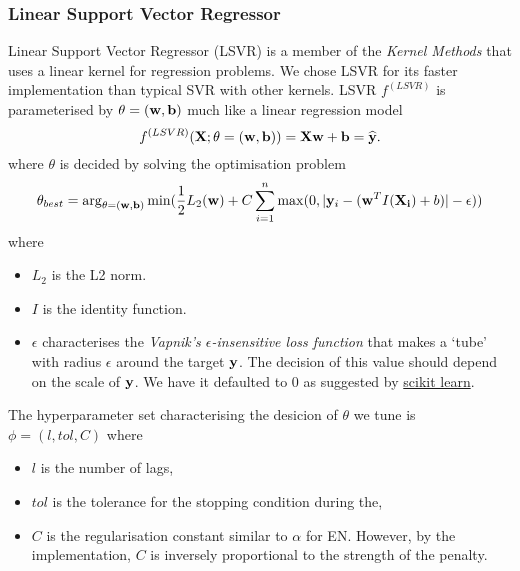 \subsubsection{Linear Support Vector Regressor}
Linear Support Vector Regressor (LSVR) is a member of the \textit{Kernel Methods} that uses a linear kernel for regression problems. We chose LSVR for its faster implementation than typical SVR with other kernels. LSVR $f^{(LSVR)}$ is parameterised by $\theta = (\mathbf{w}, \mathbf{b})$ much like a linear regression model
\begin{equation*}
    f^{(LSVR)} (\mathbf{X} ; \theta = (\mathbf{w}, \mathbf{b})) = \mathbf{X} \mathbf{w} + \mathbf{b} = \widehat{\mathbf{y}}.
\end{equation*}
where $\theta$ is decided by solving the optimisation problem
\begin{equation*}
    \theta_{best} = \arg_{\theta = (\mathbf{w}, \mathbf{b})} \min (\frac{1}{2} L_2(\mathbf{w}) + C \sum_{i=1}^{n} \max(0, |\mathbf{y}_i - (\mathbf{w}^T I(\mathbf{X_i}) + b)| - \epsilon))
\end{equation*}
where
\begin{itemize}
    \item $L_2$ is the L2 norm.
    \item $I$ is the identity function.
    \item $\epsilon$ characterises the \textit{Vapnik's $\epsilon$-insensitive loss function} that makes a `tube' with radius $\epsilon$ around the target $\mathbf{y}$. The decision of this value should depend on the scale of $\mathbf{y}$. We have it defaulted to $0$ as suggested by \href{https://scikit-learn.org/stable/modules/generated/sklearn.svm.LinearSVR.html#sklearn.svm.LinearSVR}{scikit learn}.
\end{itemize}
The hyperparameter set characterising the desicion of $\theta$ we tune is $\phi = (l, tol, C)$ where
\begin{itemize}
    \item $l$ is the number of lags,
    \item $tol$ is the tolerance for the stopping condition during the,
    \item $C$ is the regularisation constant similar to $\alpha$ for EN. However, by the implementation, $C$ is inversely proportional to the strength of the penalty.
\end{itemize}

